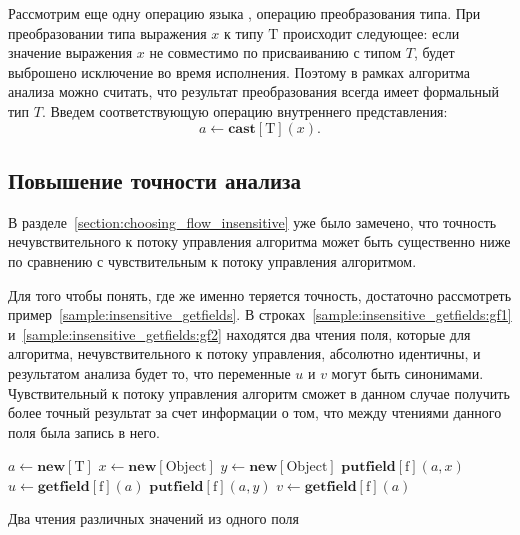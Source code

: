 \documentclass[14pt,titlepage,draft]{extarticle}
\newcommand{\java}{\eng{Java}\xspace}
\newcommand{\type}[1]{\mathrm{#1}}
\newcommand{\field}[1]{\mathrm{#1}}
\newcommand{\op}[1]{\mathbf{#1}}
\begin{document}
    Рассмотрим еще одну операцию языка \java, операцию преобразования типа. При
    преобразовании типа выражения $x$ к типу $\type{T}$ происходит следующее:
    если значение выражения $x$ не совместимо по присваиванию с типом $T$,
    будет выброшено исключение во время исполнения.
    Поэтому в рамках алгоритма анализа можно считать, что результат
    преобразования всегда имеет формальный тип $T$.
    Введем соответствующую операцию внутреннего представления:
    \[ a \gets \op{cast}[\type{T}](x). \]

  \subsection{Повышение точности анализа}
    \label{section:increase_accuracy}

    В разделе~\ref{section:choosing_flow_insensitive} уже было замечено, что
    точность нечувствительного к потоку управления алгоритма может быть
    существенно ниже по сравнению с чувствительным к потоку управления
    алгоритмом.

    Для того чтобы понять, где же именно теряется точность, достаточно
    рассмотреть пример~\ref{sample:insensitive_getfields}. В
    строках~\ref{sample:insensitive_getfields:gf1}
    и~\ref{sample:insensitive_getfields:gf2} находятся два чтения поля, которые
    для алгоритма, нечувствительного к потоку управления, абсолютно идентичны,
    и результатом анализа будет то, что переменные $u$ и $v$ могут быть
    синонимами. Чувствительный к потоку управления алгоритм сможет в данном
    случае получить более точный результат за счет информации о том, что между
    чтениями данного поля была запись в него.

    \begin{sample}
      \begin{algorithmic}[1]
        \State $a \gets \op{new}[\type{T}]$
        \State $x \gets \op{new}[\type{Object}]$
        \State $y \gets \op{new}[\type{Object}]$
        \State $\op{putfield}[\field{f}](a, x)$
        \State $u \gets \op{getfield}[\field{f}](a)$
          \label{sample:insensitive_getfields:gf1}
        \State $\op{putfield}[\field{f}](a, y)$
        \State $v \gets \op{getfield}[\field{f}](a)$
          \label{sample:insensitive_getfields:gf2}
      \end{algorithmic}
      \caption{Два чтения различных значений из одного поля}
      \label{sample:insensitive_getfields}
    \end{sample}
\end{document}
